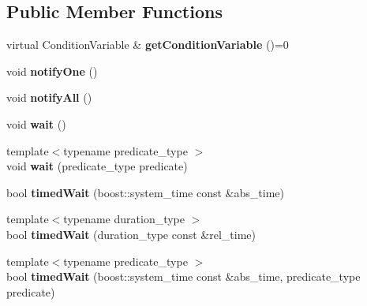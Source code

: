 \subsection*{Public Member Functions}
\begin{DoxyCompactItemize}
\item 
\hypertarget{classcore_1_1threading_1_1_condition_a073a0b111fa5762dbfe3993cf2af40dc}{virtual Condition\-Variable \& {\bfseries get\-Condition\-Variable} ()=0}\label{classcore_1_1threading_1_1_condition_a073a0b111fa5762dbfe3993cf2af40dc}

\item 
\hypertarget{classcore_1_1threading_1_1_condition_add5e0330004de9c05a86ccc11ddf268d}{void {\bfseries notify\-One} ()}\label{classcore_1_1threading_1_1_condition_add5e0330004de9c05a86ccc11ddf268d}

\item 
\hypertarget{classcore_1_1threading_1_1_condition_a057883ea17c87352d75cd75af5046622}{void {\bfseries notify\-All} ()}\label{classcore_1_1threading_1_1_condition_a057883ea17c87352d75cd75af5046622}

\item 
\hypertarget{classcore_1_1threading_1_1_condition_a57f15cfb2da071d4d673294c5ccce164}{void {\bfseries wait} ()}\label{classcore_1_1threading_1_1_condition_a57f15cfb2da071d4d673294c5ccce164}

\item 
\hypertarget{classcore_1_1threading_1_1_condition_a957e1f54b0e98980a9d777934bc08c57}{{\footnotesize template$<$typename predicate\-\_\-type $>$ }\\void {\bfseries wait} (predicate\-\_\-type predicate)}\label{classcore_1_1threading_1_1_condition_a957e1f54b0e98980a9d777934bc08c57}

\item 
\hypertarget{classcore_1_1threading_1_1_condition_a8ab9c35ba488d9bc743d03692cee17c0}{bool {\bfseries timed\-Wait} (boost\-::system\-\_\-time const \&abs\-\_\-time)}\label{classcore_1_1threading_1_1_condition_a8ab9c35ba488d9bc743d03692cee17c0}

\item 
\hypertarget{classcore_1_1threading_1_1_condition_a4e37a0fc868c0d92615c1abe480a82fc}{{\footnotesize template$<$typename duration\-\_\-type $>$ }\\bool {\bfseries timed\-Wait} (duration\-\_\-type const \&rel\-\_\-time)}\label{classcore_1_1threading_1_1_condition_a4e37a0fc868c0d92615c1abe480a82fc}

\item 
\hypertarget{classcore_1_1threading_1_1_condition_af228703cb4e03b19fd6bbc7ba274d1f3}{{\footnotesize template$<$typename predicate\-\_\-type $>$ }\\bool {\bfseries timed\-Wait} (boost\-::system\-\_\-time const \&abs\-\_\-time, predicate\-\_\-type predicate)}\label{classcore_1_1threading_1_1_condition_af228703cb4e03b19fd6bbc7ba274d1f3}


\end{DoxyCompactItemize}
